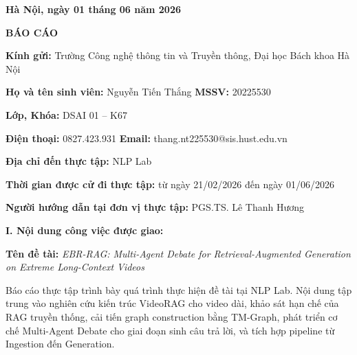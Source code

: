 \documentclass[12pt,a4paper]{article}
\begin{document}
\begin{titlepage}
  \thispagestyle{empty}

  \begin{center}
    \textbf{Hà Nội, ngày 01 tháng 06 năm 2026}

    \vspace{1.35cm}

    {\Large\bfseries BÁO CÁO}
  \end{center}

  \vspace{0.7cm}

  \noindent\textbf{Kính gửi:} Trường Công nghệ thông tin và Truyền thông, Đại học Bách khoa Hà Nội

  \vspace{0.55cm}

  \noindent\textbf{Họ và tên sinh viên:} Nguyễn Tiến Thắng \hfill \textbf{MSSV:} 20225530

  \vspace{0.2cm}

  \noindent\textbf{Lớp, Khóa:} DSAI 01 -- K67

  \vspace{0.2cm}

  \noindent\textbf{Điện thoại:} 0827.423.931 \hfill \textbf{Email:} thang.nt225530@sis.hust.edu.vn

  \vspace{0.2cm}

  \noindent\textbf{Địa chỉ đến thực tập:} NLP Lab

  \vspace{0.2cm}

  \noindent\textbf{Thời gian được cử đi thực tập:} từ ngày 21/02/2026 đến ngày 01/06/2026

  \vspace{0.2cm}

  \noindent\textbf{Người hướng dẫn tại đơn vị thực tập:} PGS.TS. Lê Thanh Hương

  \vspace{0.9cm}

  \noindent\textbf{I. Nội dung công việc được giao:}

  \vspace{0.3cm}

  \noindent\textbf{Tên đề tài:} \textit{EBR-RAG: Multi-Agent Debate for Retrieval-Augmented Generation on Extreme Long-Context Videos}

  \vspace{0.45cm}

  \noindent Báo cáo thực tập trình bày quá trình thực hiện đề tài tại NLP Lab. Nội dung tập trung vào nghiên cứu kiến trúc VideoRAG cho video dài, khảo sát hạn chế của RAG truyền thống, cải tiến graph construction bằng TM-Graph, phát triển cơ chế Multi-Agent Debate cho giai đoạn sinh câu trả lời, và tích hợp pipeline từ Ingestion đến Generation.


\end{titlepage}
\end{document}

